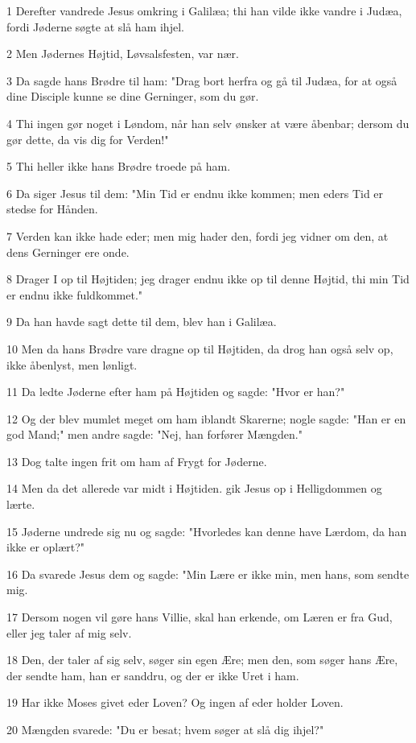 \par 1 Derefter vandrede Jesus omkring i Galilæa; thi han vilde ikke vandre i Judæa, fordi Jøderne søgte at slå ham ihjel.
\par 2 Men Jødernes Højtid, Løvsalsfesten, var nær.
\par 3 Da sagde hans Brødre til ham: "Drag bort herfra og gå til Judæa, for at også dine Disciple kunne se dine Gerninger, som du gør.
\par 4 Thi ingen gør noget i Løndom, når han selv ønsker at være åbenbar; dersom du gør dette, da vis dig for Verden!"
\par 5 Thi heller ikke hans Brødre troede på ham.
\par 6 Da siger Jesus til dem: "Min Tid er endnu ikke kommen; men eders Tid er stedse for Hånden.
\par 7 Verden kan ikke hade eder; men mig hader den, fordi jeg vidner om den, at dens Gerninger ere onde.
\par 8 Drager I op til Højtiden; jeg drager endnu ikke op til denne Højtid, thi min Tid er endnu ikke fuldkommet."
\par 9 Da han havde sagt dette til dem, blev han i Galilæa.
\par 10 Men da hans Brødre vare dragne op til Højtiden, da drog han også selv op, ikke åbenlyst, men lønligt.
\par 11 Da ledte Jøderne efter ham på Højtiden og sagde: "Hvor er han?"
\par 12 Og der blev mumlet meget om ham iblandt Skarerne; nogle sagde: "Han er en god Mand;" men andre sagde: "Nej, han forfører Mængden."
\par 13 Dog talte ingen frit om ham af Frygt for Jøderne.
\par 14 Men da det allerede var midt i Højtiden. gik Jesus op i Helligdommen og lærte.
\par 15 Jøderne undrede sig nu og sagde: "Hvorledes kan denne have Lærdom, da han ikke er oplært?"
\par 16 Da svarede Jesus dem og sagde: "Min Lære er ikke min, men hans, som sendte mig.
\par 17 Dersom nogen vil gøre hans Villie, skal han erkende, om Læren er fra Gud, eller jeg taler af mig selv.
\par 18 Den, der taler af sig selv, søger sin egen Ære; men den, som søger hans Ære, der sendte ham, han er sanddru, og der er ikke Uret i ham.
\par 19 Har ikke Moses givet eder Loven? Og ingen af eder holder Loven.
\par 20 Mængden svarede: "Du er besat; hvem søger at slå dig ihjel?"
